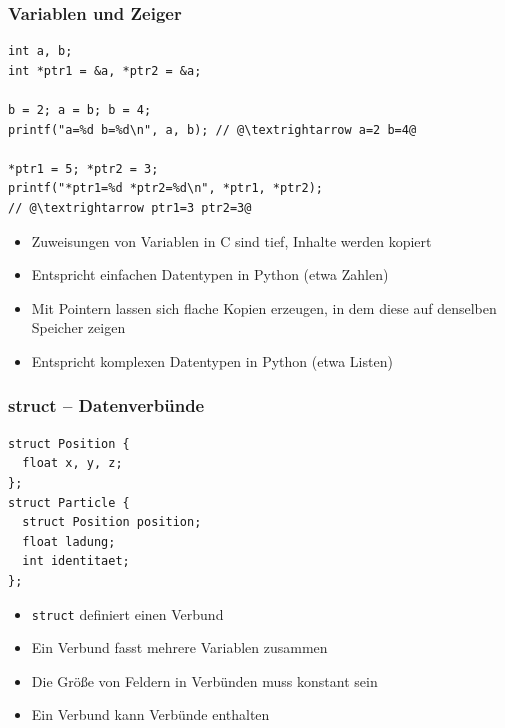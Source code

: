 \documentclass{slides}
\begin{document}
\begin{frame}[fragile]
  \frametitle{Variablen und Zeiger}
\begin{lstlisting}
int a, b;
int *ptr1 = &a, *ptr2 = &a;

b = 2; a = b; b = 4;
printf("a=%d b=%d\n", a, b); // @\textrightarrow a=2 b=4@

*ptr1 = 5; *ptr2 = 3;
printf("*ptr1=%d *ptr2=%d\n", *ptr1, *ptr2);
// @\textrightarrow ptr1=3 ptr2=3@
\end{lstlisting}

  \begin{itemize}
  \item Zuweisungen von Variablen in C sind tief, Inhalte werden kopiert
  \item Entspricht einfachen Datentypen in Python (etwa Zahlen)
  \item Mit Pointern lassen sich flache Kopien erzeugen, in dem diese auf denselben Speicher zeigen
  \item Entspricht komplexen Datentypen in Python (etwa Listen)
  \end{itemize}
\end{frame}

\begin{frame}[fragile]
  \frametitle{struct -- Datenverbünde}
\begin{lstlisting}[emph=struct]
struct Position {
  float x, y, z;
};
struct Particle {
  struct Position position;
  float ladung;
  int identitaet;
};
\end{lstlisting}

  \begin{itemize}
  \item \lstinline!struct! definiert einen Verbund
  \item Ein Verbund fasst mehrere Variablen zusammen
  \item Die Größe von Feldern in Verbünden muss konstant sein
  \item Ein Verbund kann Verbünde enthalten
  \end{itemize}
\end{frame}
\end{document}
